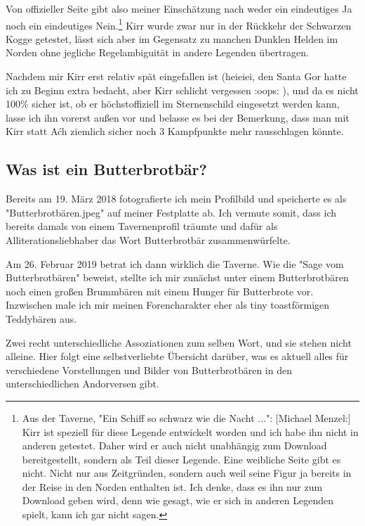 \documentclass[10pt, a4paper, oneside]{book}
\begin{document}
{Von offizieller Seite gibt also meiner Einschätzung nach weder ein eindeutiges Ja noch ein eindeutiges Nein.\footnote{Aus der Taverne, "Ein Schiff so schwarz wie die Nacht ...": [Michael Menzel:] Kirr ist speziell für diese Legende entwickelt worden und ich habe ihn nicht in anderen getestet. Daher wird er auch nicht unabhängig zum Download bereitgestellt, sondern als Teil dieser Legende. Eine weibliche Seite gibt es nicht. Nicht nur aus Zeitgründen, sondern auch weil seine Figur ja bereits in der Reise in den Norden enthalten ist. Ich denke, dass es ihn nur zum Download geben wird, denn wie gesagt, wie er sich in anderen Legenden spielt, kann ich gar nicht sagen.} Kirr wurde zwar nur in der Rückkehr der Schwarzen Kogge getestet, lässt sich aber im Gegensatz zu manchen Dunklen Helden im Norden ohne jegliche Regelambiguität in andere Legenden übertragen.



Nachdem mir Kirr erst relativ spät eingefallen ist (heieiei, den Santa Gor hatte ich zu Beginn extra bedacht, aber Kirr schlicht vergessen :oops: ), und da es nicht 100\% sicher ist, ob er höchstoffiziell im Sternenschild eingesetzt werden kann, lasse ich ihn vorerst außen vor und belasse es bei der Bemerkung, dass man mit Kirr statt Aćh ziemlich sicher noch 3 Kampfpunkte mehr rausschlagen könnte.

}







\begin{chapterbox}
    \chapter{Was ist ein Butterbrotbär?}
    \label{was-ist-ein-butterbrotbaer}
    Bereits am 19. März 2018 fotografierte ich mein Profilbild und speicherte es als "Butterbrotbären.jpeg" auf meiner Festplatte ab. Ich vermute somit, dass ich bereits damals von einem Tavernenprofil träumte und dafür als Alliterationsliebhaber das Wort Butterbrotbär zusammenwürfelte.
    
    Am 26. Februar 2019 betrat ich dann wirklich die Taverne. Wie die "Sage vom Butterbrotbären" beweist, stellte ich mir zunächst unter einem Butterbrotbären noch einen großen Brummbären mit einem Hunger für Butterbrote vor. Inzwischen male ich mir meinen Forencharakter eher als tiny toastförmigen Teddybären aus. 
    
    Zwei recht unterschiedliche Assoziationen zum selben Wort, und sie stehen nicht alleine. Hier folgt eine selbstverliebte Übersicht darüber, was es aktuell alles für verschiedene Vorstellungen und Bilder von Butterbrotbären in den unterschiedlichen Andorversen gibt.
\end{chapterbox}
\end{document}
